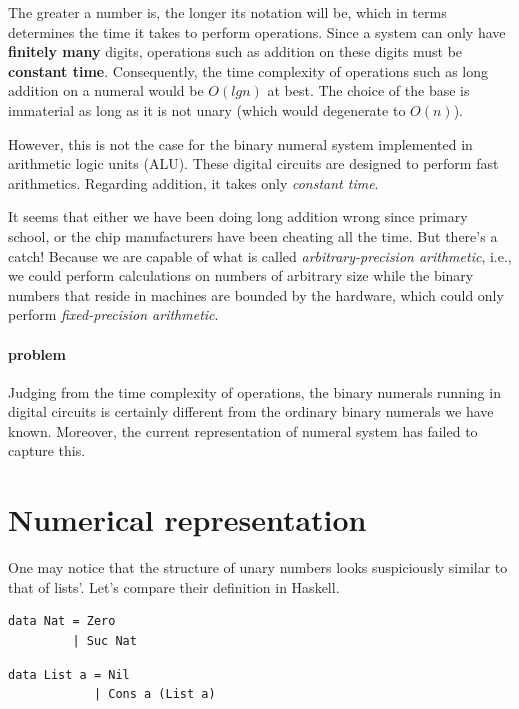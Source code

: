 \documentclass[../thesis.tex]{subfiles}
\begin{document}
The greater a number is, the longer its notation will be, which in terms
determines the time it takes to perform operations.
Since a system can only have \textbf{finitely many} digits, operations such as
addition on these digits must be \textbf{constant time}.
Consequently, the time complexity of operations such as long addition on a numeral
would be $ O(lg n) $ at best.
The choice of the base is immaterial as long as it is not unary (which would degenerate to $ O(n) $).

However, this is not the case for the binary numeral system implemented in
arithmetic logic units (ALU). These digital circuits are designed to perform fast
arithmetics. Regarding addition, it takes only \textit{constant time}.

It seems that either we have been doing long addition wrong since primary school,
or the chip manufacturers have been cheating all the time. But there's a catch!
Because we are capable of what is called \textit{arbitrary-precision arithmetic},
i.e., we could perform calculations on numbers of arbitrary size
while the binary numbers that reside in machines are bounded by the hardware,
which could only perform \textit{fixed-precision arithmetic}.

\paragraph{problem}
Judging from the time complexity of operations, the binary numerals running in
digital circuits is certainly different from the ordinary binary numerals we have
known. Moreover, the current representation of numeral system has failed to capture this.

\section{Numerical representation}

One may notice that the structure of unary numbers looks suspiciously similar
to that of lists'. Let's compare their definition in Haskell.

\noindent\begin{minipage}{.45\textwidth}
\begin{lstlisting}
data Nat = Zero
         | Suc Nat
\end{lstlisting}
\end{minipage}\hfill
\begin{minipage}{.48\textwidth}
\begin{lstlisting}
data List a = Nil
            | Cons a (List a)
\end{lstlisting}
\end{minipage}
\end{document}
